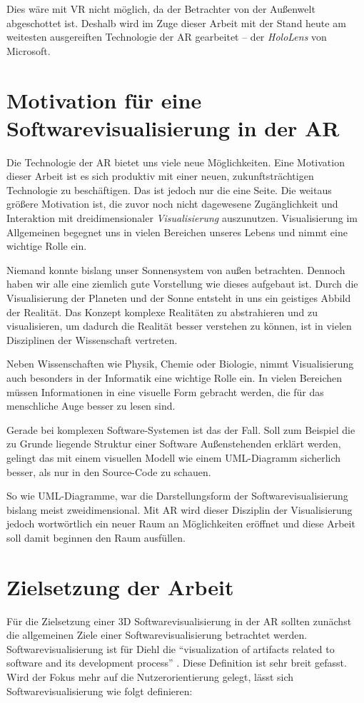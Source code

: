 Dies wäre mit VR nicht möglich, da der Betrachter von der Außenwelt abgeschottet ist. Deshalb wird im Zuge dieser Arbeit mit der Stand heute am weitesten ausgereiften Technologie der AR gearbeitet -- der \emph{HoloLens} von Microsoft.

\section{Motivation für eine Softwarevisualisierung in der AR}
Die Technologie der AR bietet uns viele neue Möglichkeiten. Eine Motivation dieser Arbeit ist es sich produktiv mit einer neuen, zukunftsträchtigen Technologie zu beschäftigen. Das ist jedoch nur die eine Seite. Die weitaus größere Motivation ist, die zuvor noch nicht dagewesene Zugänglichkeit und Interaktion mit dreidimensionaler \emph{Visualisierung} auszunutzen. Visualisierung im Allgemeinen begegnet uns in vielen Bereichen unseres Lebens und nimmt eine wichtige Rolle ein.

Niemand konnte bislang unser Sonnensystem von außen betrachten. Dennoch haben wir alle eine ziemlich gute Vorstellung wie dieses aufgebaut ist. Durch die Visualisierung der Planeten und der Sonne entsteht in uns ein geistiges Abbild der Realität. Das Konzept komplexe Realitäten zu abstrahieren und zu visualisieren, um dadurch die Realität besser verstehen zu können, ist in vielen Disziplinen der Wissenschaft vertreten.

Neben Wissenschaften wie Physik, Chemie oder Biologie, nimmt Visualisierung auch besonders in der Informatik eine wichtige Rolle ein. In vielen Bereichen müssen Informationen in eine visuelle Form gebracht werden, die für das menschliche Auge besser zu lesen sind.

Gerade bei komplexen Software-Systemen ist das der Fall. Soll zum Beispiel die zu Grunde liegende Struktur einer Software Außenstehenden erklärt werden, gelingt das mit einem visuellen Modell wie einem UML-Diagramm sicherlich besser, als nur in den Source-Code zu schauen.

So wie UML-Diagramme, war die Darstellungsform der Softwarevisualisierung bislang meist zweidimensional. Mit AR wird dieser Disziplin der Visualisierung jedoch wortwörtlich ein neuer Raum an Möglichkeiten eröffnet und diese Arbeit soll damit beginnen den Raum ausfüllen.

\section{Zielsetzung der Arbeit}
Für die Zielsetzung einer 3D Softwarevisualisierung in der AR sollten zunächst die allgemeinen Ziele einer Softwarevisualisierung betrachtet werden. Softwarevisualisierung ist für Diehl die "`visualization of artifacts related to software and its development process"' \cite{diehl2007software}. Diese Definition ist sehr breit gefasst. Wird der Fokus mehr auf die Nutzerorientierung gelegt, lässt sich Softwarevisualisierung wie folgt definieren:


